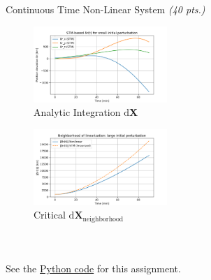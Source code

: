 \begin{hwkProblem}{3}{Continuous Time Non-Linear System \textit{(40 pts.)}}
	\hwkPart{} \label{hwk:s03e}

	\begin{figure}[H] \label{fig:s03e}
		\begin{center}
			\includegraphics[width=0.45\textwidth]{./outputs/figures/s03e.png}
		\end{center}
		\caption{Analytic Integration \( \mathrm{d}\bm{X} \)}
	\end{figure}

	\hwkPart{} \label{hwk:s03f}

	\begin{figure}[H] \label{fig:s03f}
		\begin{center}
			\includegraphics[width=0.45\textwidth]{./outputs/figures/s03f.png}
		\end{center}
		\caption{Critical \( \mathrm{d}\bm{X}_{\text{neighborhood}} \)}
	\end{figure}

	\hwkPart{} \label{hwk:s03g}

	\inputminted{python}{./outputs/text/s03g.txt}

	\hwkPart{} \label{hwk:s03h}

	\inputminted{python}{./outputs/text/s03h.txt}

	\hwkPart{} \label{hwk:s03i}

	\inputminted{python}{./outputs/text/s03i.txt}

	\hwkCode{} \label{code:s03}

	See the \href{https://www.github.com/vaisriv/enae441-hw03/blob/main/src/hw03.py#L347}{Python code} for this assignment.

\end{hwkProblem}


